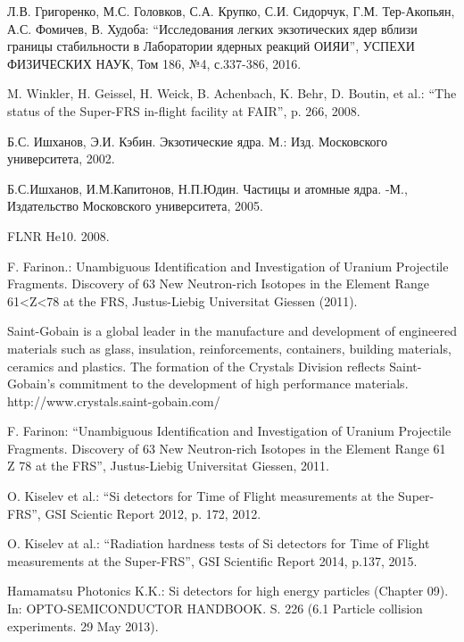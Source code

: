 \newpage
\begin{thebibliography}{999}
	
	Л.В. Григоренко, М.С. Головков, С.А. Крупко, С.И. Сидорчук, Г.М. Тер-Акопьян, А.С. Фомичев, В. Худоба: ``Исследования легких экзотических ядер вблизи границы стабильности в Лаборатории ядерных реакций ОИЯИ'', УСПЕХИ ФИЗИЧЕСКИХ НАУК, Том 186, №4, с.337-386, 2016.
	
	M. Winkler, H. Geissel, H. Weick, B. Achenbach, K. Behr, D. Boutin, et al.:
	``The status of the Super-FRS in-flight facility at FAIR'', p. 266, 2008.
	
	Б.С. Ишханов, Э.И. Кэбин. Экзотические ядра. М.: Изд. Московского университета, 2002.
	
	Б.С.Ишханов, И.М.Капитонов, Н.П.Юдин. Частицы и атомные ядра. -М., Издательство Московского университета, 2005.
	
	FLNR He10. 2008.
	
	F. Farinon.: Unambiguous Identification and Investigation of Uranium Projectile Fragments. Discovery of 63 New Neutron-rich Isotopes in the Element Range 61<Z<78 at the FRS, Justus-Liebig Universitat Giessen (2011).
	
	Saint-Gobain is a global leader in the manufacture and development of engineered materials such as glass, insulation, reinforcements, containers, building materials, ceramics and plastics.
	The formation of the Crystals Division reflects Saint-Gobain’s commitment to the development of high performance materials. 
	http://www.crystals.saint-gobain.com/	
	
	F. Farinon: ``Unambiguous Identification and Investigation of Uranium Projectile Fragments. Discovery of 63 New Neutron-rich Isotopes in the Element Range 61  Z  78 at the FRS'', Justus-Liebig Universitat Giessen, 2011.
	
	O. Kiselev et al.: ``Si detectors for Time of Flight measurements at the Super-FRS'', GSI Scientic Report 2012, p. 172, 2012.
	
	O. Kiselev at al.: ``Radiation hardness tests of Si detectors for Time of Flight measurements at the Super-FRS'', GSI Scientific Report 2014, p.137, 2015.
		
	Hamamatsu Photonics K.K.: Si detectors for high energy particles (Chapter 09). In: OPTO-SEMICONDUCTOR HANDBOOK. S. 226 (6.1 Particle collision experiments. 29 May 2013).
	

\end{thebibliography}
